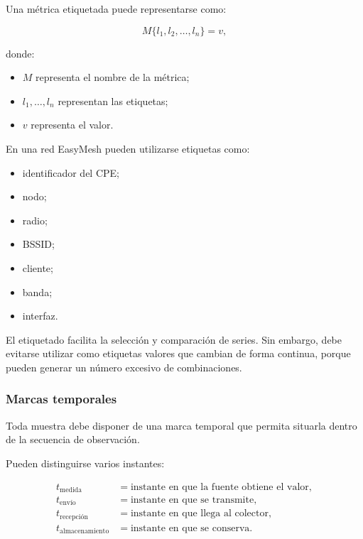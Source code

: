 Una métrica etiquetada puede representarse como:

\[
    M
    \{
        l_1,
        l_2,
        \ldots,
        l_n
    \}
    =
    v,
\]

donde:

\begin{itemize}
    \item \(M\) representa el nombre de la métrica;

    \item \(l_1,\ldots,l_n\) representan las etiquetas;

    \item \(v\) representa el valor.
\end{itemize}

En una red EasyMesh pueden utilizarse etiquetas como:

\begin{itemize}
    \item identificador del CPE;

    \item nodo;

    \item radio;

    \item BSSID;

    \item cliente;

    \item banda;

    \item interfaz.
\end{itemize}

El etiquetado facilita la selección y comparación de series. Sin
embargo, debe evitarse utilizar como etiquetas valores que cambian de
forma continua, porque pueden generar un número excesivo de
combinaciones.


\subsubsection*{Marcas temporales}

Toda muestra debe disponer de una marca temporal que permita situarla
dentro de la secuencia de observación.

Pueden distinguirse varios instantes:

\[
\begin{aligned}
    t_{\mathrm{medida}}
    &=
    \text{instante en que la fuente obtiene el valor},\\
    t_{\mathrm{envío}}
    &=
    \text{instante en que se transmite},\\
    t_{\mathrm{recepción}}
    &=
    \text{instante en que llega al colector},\\
    t_{\mathrm{almacenamiento}}
    &=
    \text{instante en que se conserva}.
\end{aligned}
\]

